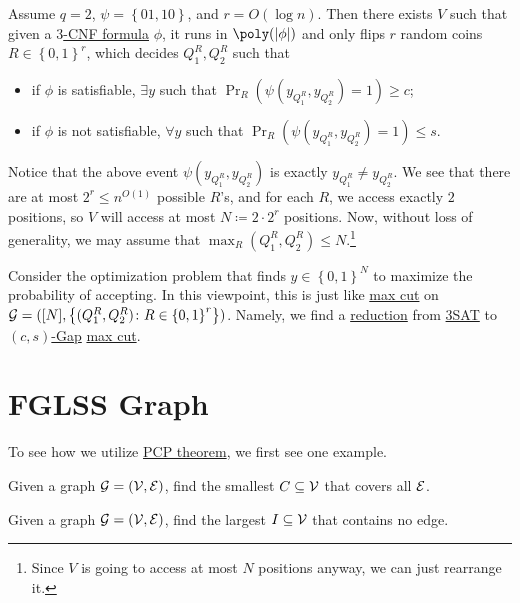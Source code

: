 Assume \(q = 2\), \(\psi = \left\{ 01, 10 \right\} \), and \(r = O(\log n)\). Then there exists \(V\) such that given a \hyperref[def:k-CNF]{\(3\)-CNF formula} \(\phi \), it runs in \(\poly(\vert \phi  \vert )\) and only flips \(r\) random coins \(R\in \left\{ 0, 1 \right\} ^r\), which decides \(Q_1^R, Q_2^R\) such that
\begin{itemize}
	\item if \(\phi \) is satisfiable, \(\exists y\) such that \(\Pr_{R}(\psi (y_{Q_1^R}, y_{Q_2^R}) = 1) \geq c\);
	\item if \(\phi \) is not satisfiable, \(\forall y\) such that \(\Pr_{R}(\psi (y_{Q_1^R}, y_{Q_2^R}) = 1) \leq s\).
\end{itemize}
Notice that the above event \(\psi (y_{Q_1^R}, y_{Q_2^R})\) is exactly \(y_{Q_1^R} \neq y_{Q_2^R}\). We see that there are at most \(2^r \leq n^{O(1)}\) possible \(R\)'s, and for each \(R\), we access exactly \(2\) positions, so \(V\) will access at most \(N\coloneqq 2\cdot 2^r\) positions. Now, without loss of generality, we may assume that \(\max _R (Q_1^R, Q_2^R) \leq N\).\footnote{Since \(V\) is going to access at most \(N\) positions anyway, we can just rearrange it.}

Consider the optimization problem that finds \(y\in \left\{ 0, 1 \right\} ^N\) to maximize the probability of accepting. In this viewpoint, this is just like \hyperref[prb:max-cut]{max cut} on \(\mathcal{\MakeUppercase{g}} =([N], \left\{ (Q_1^R, Q_2^R)\colon R\in \left\{ 0, 1 \right\} ^r \right\} )\). Namely, we find a \hyperref[def:reduction]{reduction} from \hyperref[prb:max-3SAT]{3SAT} to \hyperref[def:c-s-Gap]{\((c, s)\)-Gap} \hyperref[prb:max-cut]{max cut}.

\section{FGLSS Graph}
To see how we utilize \hyperref[thm:PCP]{PCP theorem}, we first see one example.
\begin{problem}\label{prb:vertex-cover}
Given a graph \(\mathcal{\MakeUppercase{g}} =(\mathcal{\MakeUppercase{v}} , \mathcal{\MakeUppercase{e}} )\), find the smallest \(C \subseteq \mathcal{\MakeUppercase{v}} \) that covers all \(\mathcal{\MakeUppercase{e}} \).
\end{problem}

\begin{problem}\label{prb:independent-set}
Given a graph \(\mathcal{\MakeUppercase{g}} =(\mathcal{\MakeUppercase{v}} , \mathcal{\MakeUppercase{e}} )\), find the largest \(I \subseteq \mathcal{\MakeUppercase{v}} \) that contains no edge.
\end{problem}

